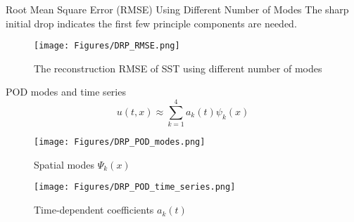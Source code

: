 \documentclass[9pt,xcolor=dvipsnames]{beamer}
\begin{document}






\begin{frame}{Root Mean Square  Error (RMSE) Using Different Number of Modes}
    The sharp initial drop indicates the first few principle components are needed.
\vspace{0.25cm}
\begin{figure}
    \centering
    \texttt{[image: Figures/DRP\_RMSE.png]}
    \caption{The reconstruction RMSE of SST using different number of modes }
    \label{fig:enter-label}
\end{figure}
\end{frame}

\begin{frame}{POD modes and time series}
\[
\boxed{u(t,x) \approx \sum_{k=1}^{4} a_k(t) \psi_k(x)}
\]
    \begin{minipage}{0.48\textwidth}
        \centering
        \begin{figure}
            \centering
            \texttt{[image: Figures/DRP\_POD\_modes.png]}
        \caption{Spatial modes $\Psi_k(x)$}
        \end{figure}
    \end{minipage}
    \hfill
    \begin{minipage}{0.45\textwidth}
        \centering
        \begin{figure}
            \centering
            \texttt{[image: Figures/DRP\_POD\_time\_series.png]}
        \caption{Time-dependent coefficients $a_k(t)$}
        \end{figure}
    \end{minipage}
\end{frame}
\end{document}
